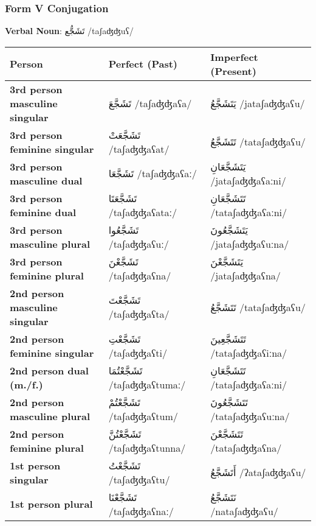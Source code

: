 \documentclass[letterpaper,12pt]{article}
\begin{document}
\subsubsection*{Form V Conjugation}
\large \textbf{Verbal Noun}: \textarabic{تَشَجُّع} /taʃaʤʤuʕ/

\begin{longtable}{|>{\raggedright}p{3.5cm}|p{5cm}|p{5cm}|}
\hline
\textbf{Person} & \textbf{Perfect (Past)} & \textbf{Imperfect (Present)} \\
\hline
\textbf{3rd person masculine singular} & \textarabic{تَشَجَّعَ} /taʃaʤʤaʕa/ & \textarabic{يَتَشَجَّعُ} /jataʃaʤʤaʕu/ \\
\hline
\textbf{3rd person feminine singular} & \textarabic{تَشَجَّعَتْ} /taʃaʤʤaʕat/ & \textarabic{تَتَشَجَّعُ} /tataʃaʤʤaʕu/ \\
\hline
\textbf{3rd person masculine dual} & \textarabic{تَشَجَّعَا} /taʃaʤʤaʕaː/ & \textarabic{يَتَشَجَّعَانِ} /jataʃaʤʤaʕaːni/ \\
\hline
\textbf{3rd person feminine dual} & \textarabic{تَشَجَّعَتَا} /taʃaʤʤaʕataː/ & \textarabic{تَتَشَجَّعَانِ} /tataʃaʤʤaʕaːni/ \\
\hline
\textbf{3rd person masculine plural} & \textarabic{تَشَجَّعُوا} /taʃaʤʤaʕuː/ & \textarabic{يَتَشَجَّعُونَ} /jataʃaʤʤaʕuːna/ \\
\hline
\textbf{3rd person feminine plural} & \textarabic{تَشَجَّعْنَ} /taʃaʤʤaʕna/ & \textarabic{يَتَشَجَّعْنَ} /jataʃaʤʤaʕna/ \\
\hline
\textbf{2nd person masculine singular} & \textarabic{تَشَجَّعْتَ} /taʃaʤʤaʕta/ & \textarabic{تَتَشَجَّعُ} /tataʃaʤʤaʕu/ \\
\hline
\textbf{2nd person feminine singular} & \textarabic{تَشَجَّعْتِ} /taʃaʤʤaʕti/ & \textarabic{تَتَشَجَّعِينَ} /tataʃaʤʤaʕiːna/ \\
\hline
\textbf{2nd person dual (m./f.)} & \textarabic{تَشَجَّعْتُمَا} /taʃaʤʤaʕtumaː/ & \textarabic{تَتَشَجَّعَانِ} /tataʃaʤʤaʕaːni/ \\
\hline
\textbf{2nd person masculine plural} & \textarabic{تَشَجَّعْتُمْ} /taʃaʤʤaʕtum/ & \textarabic{تَتَشَجَّعُونَ} /tataʃaʤʤaʕuːna/ \\
\hline
\textbf{2nd person feminine plural} & \textarabic{تَشَجَّعْتُنَّ} /taʃaʤʤaʕtunna/ & \textarabic{تَتَشَجَّعْنَ} /tataʃaʤʤaʕna/ \\
\hline
\textbf{1st person singular} & \textarabic{تَشَجَّعْتُ} /taʃaʤʤaʕtu/ & \textarabic{أَتَشَجَّعُ} /ʔataʃaʤʤaʕu/ \\
\hline
\textbf{1st person plural} & \textarabic{تَشَجَّعْنَا} /taʃaʤʤaʕnaː/ & \textarabic{نَتَشَجَّعُ} /nataʃaʤʤaʕu/ \\
\hline
\end{longtable}
\end{document}
